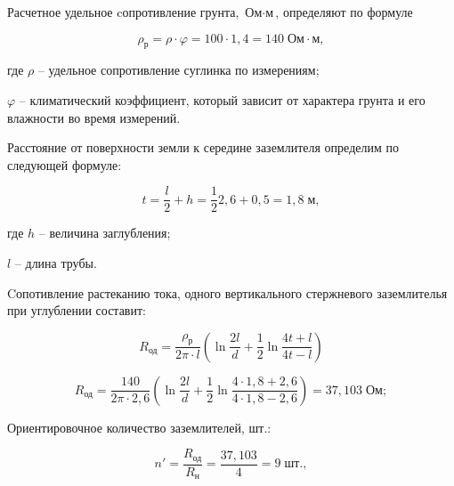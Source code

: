             Расчетное удельное cопротивление грунта, $\text{Ом} \cdot
            \text{м}$, определяют по формуле

        \begin{equation*}
                \rho_\text{р} = \rho \cdot \varphi =
                    100 \cdot 1,4 = 140 \; \text{Ом} \cdot \text{м},
        \end{equation*}

        где $\rho$ -- удельное сопротивление суглинка по измерениям;

        $\varphi$ -- климатический коэффициент, который зависит от характера
        грунта и его влажности во время измерений. 

        Расстояние от поверхности земли к середине заземлителя определим по
        следующей формуле:

        \begin{equation*}
                t = \frac{l}{2} + h = 
                    \frac{1}{2} 2,6 + 0,5 = 1,8 \; \text{м},
        \end{equation*}

%
        где $h$ -- величина заглубления;

        $l$ -- длина трубы. 

        Cопотивление растеканию тока, одного вертикального стержневого
        заземлителья при углублении составит:

        \begin{equation*}
                R_\text{од} = \frac{\rho_\text{р}}{2\pi \cdot l}
                    \left( \ln \frac{2l}{d} + \frac{1}{2} 
                        \ln \frac{4t + l}{4t - l} \right)
        \end{equation*}

        \begin{equation*}
                R_\text{од} = \frac{140}{2\pi \cdot 2,6}
                    \left( \ln \frac{2l}{d} + \frac{1}{2} 
                        \ln \frac{4 \cdot 1,8 + 2,6}{4 \cdot 1,8 - 2,6} \right)
                            = 37,103 \; \text{Ом};
        \end{equation*}

        Ориентировочное количество заземлителей, шт.:

        \begin{equation*}
                n' = \frac{R_\text{од}}{R_\text{н}}
                    = \frac{37,103}{4} = 9 \; \text{шт.},
        \end{equation*}

